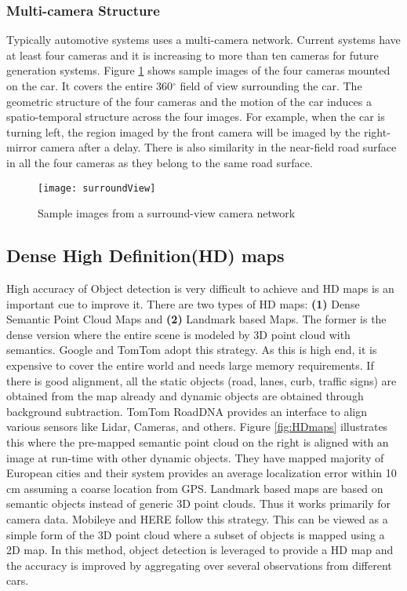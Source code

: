 \documentclass[conference]{IEEEtran}
\begin{document}
\subsubsection{Multi-camera Structure}
Typically automotive systems uses a multi-camera network. Current systems have at least four cameras and it is increasing to more than ten cameras for future generation systems. Figure \ref{fig:surround} shows sample images of the four cameras mounted on the car. It covers the entire 360$^{\circ}$ field of view surrounding the car. The geometric structure of the four cameras and the motion of the car induces a spatio-temporal structure across the four images. For example, when the car is turning left, the region imaged by the front camera will be imaged by the right-mirror camera after a delay. There is also similarity in the near-field road surface in all the four cameras as they belong to the same road surface.

\begin{figure}[!t]
\centering
\texttt{[image: surroundView]}
\caption{Sample images from a surround-view camera network }
\label{fig:surround}
\end{figure}\subsection{Dense High Definition(HD) maps}

High accuracy of Object detection is very difficult to achieve and HD maps is an important cue to improve it. There are two types of HD maps: \textbf{(1)} Dense Semantic Point Cloud Maps and \textbf{(2)} Landmark based Maps. The former is the dense version where the entire scene is modeled by 3D point cloud with semantics. Google and TomTom adopt this strategy. As this is high end, it is expensive to cover the entire world and needs large memory requirements.  If there is good alignment, all the static objects (road, lanes, curb, traffic signs) are obtained from the map already and dynamic objects are obtained through background subtraction. TomTom RoadDNA\cite{TomTomRoadDNA} provides an interface to align various sensors like Lidar, Cameras, and others. Figure \ref{fig:HDmaps} illustrates this where the pre-mapped semantic point cloud on the right is aligned with an image at run-time with other dynamic objects. They have mapped majority of European cities and their system provides an average localization error within 10 cm assuming a coarse location from GPS. Landmark based maps are based on semantic objects instead of generic 3D point clouds. Thus it works primarily for camera data. Mobileye and HERE follow this strategy. This can be viewed as a simple form of the 3D point cloud where a subset of objects is mapped using a 2D map. In this method, object detection is leveraged to provide a HD map and the accuracy is improved by aggregating over several observations from different cars. 
\end{document}
